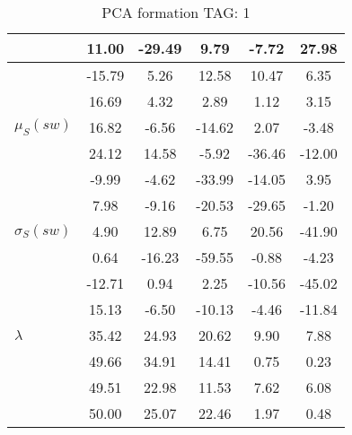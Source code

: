\begin{table}[h!]
\begin{center}
\begin{tabular}{| l | c | c | c | c | c |}
 & 11.00  & -29.49  & 9.79  & -7.72  & 27.98 \\\hline
 & -15.79  & 5.26  & 12.58  & 10.47  & 6.35 \\\hline
 & 16.69  & 4.32  & 2.89  & 1.12  & 3.15 \\\hline
$\mu_S(sw)$ & 16.82  & -6.56  & -14.62  & 2.07  & -3.48 \\\hline
 & 24.12  & 14.58  & -5.92  & -36.46  & -12.00 \\\hline
 & -9.99  & -4.62  & -33.99  & -14.05  & 3.95 \\\hline
 & 7.98  & -9.16  & -20.53  & -29.65  & -1.20 \\\hline
$\sigma_S(sw)$ & 4.90  & 12.89  & 6.75  & 20.56  & -41.90 \\\hline
 & 0.64  & -16.23  & -59.55  & -0.88  & -4.23 \\\hline
 & -12.71  & 0.94  & 2.25  & -10.56  & -45.02 \\\hline
 & 15.13  & -6.50  & -10.13  & -4.46  & -11.84 \\\hline
$\lambda$ & 35.42  & 24.93  & 20.62  & 9.90  & 7.88 \\\hline
 & 49.66  & 34.91  & 14.41  & 0.75  & 0.23 \\\hline
 & 49.51  & 22.98  & 11.53  & 7.62  & 6.08 \\\hline
 & 50.00  & 25.07  & 22.46  & 1.97  & 0.48 \\\hline
\end{tabular}
\caption{PCA formation TAG: 1}
\end{center}
\end{table}